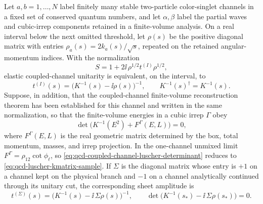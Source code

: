 \begin{lemma}
\label{lem:qcd-coupled-channel-kmatrix-sheet}
Let \(a,b=1,\ldots,N\) label finitely many stable two-particle
color-singlet channels in a fixed set of conserved quantum numbers, and let
\(\alpha,\beta\) label the partial waves and cubic-irrep components retained
in a finite-volume analysis.  On a real interval below the next omitted
threshold, let \(\rho(s)\) be the positive diagonal matrix with entries
\(\rho_a(s)=2k_a(s)/\sqrt s\), repeated on the retained angular-momentum
indices.  With the normalization
\[
  S=1+2\ii\,\rho^{1/2}t^{(I)}\rho^{1/2},
\]
elastic coupled-channel unitarity is equivalent, on the interval, to
\begin{equation}
  t^{(I)}(s)=\bigl(K^{-1}(s)-\ii\rho(s)\bigr)^{-1},
  \qquad
  K^{-1}(s)^\dagger=K^{-1}(s).
  \label{eq:qcd-coupled-channel-kmatrix}
\end{equation}
Suppose, in addition, that the coupled-channel finite-volume reconstruction
theorem has been established for this channel and written in the same
normalization, so that the finite-volume energies in a cubic irrep
\(\Gamma\) obey
\begin{equation}
  \det\!\bigl(K^{-1}(E^2)+F^\Gamma(E,L)\bigr)=0,
  \label{eq:qcd-coupled-channel-luscher-determinant}
\end{equation}
where \(F^\Gamma(E,L)\) is the real geometric matrix determined by the box,
total momentum, masses, and irrep projection.  In the one-channel unmixed
limit \(F^\Gamma=\rho_{12}\cot\phi_\ell\), so
\eqref{eq:qcd-coupled-channel-luscher-determinant} reduces to
\eqref{eq:qcd-luscher-kmatrix-sample}.  If \(\Sigma\) is the diagonal matrix
whose entry is \(+1\) on a channel kept on the physical branch and \(-1\) on
a channel analytically continued through its unitary cut, the corresponding
sheet amplitude is
\begin{equation}
  t^{(\Sigma)}(s)=
  \bigl(K^{-1}(s)-\ii\,\Sigma\rho(s)\bigr)^{-1},
  \qquad
  \det\!\bigl(K^{-1}(s_\ast)-\ii\,\Sigma\rho(s_\ast)\bigr)=0 .
  \label{eq:qcd-coupled-channel-sheet-pole}
\end{equation}
\end{lemma}

